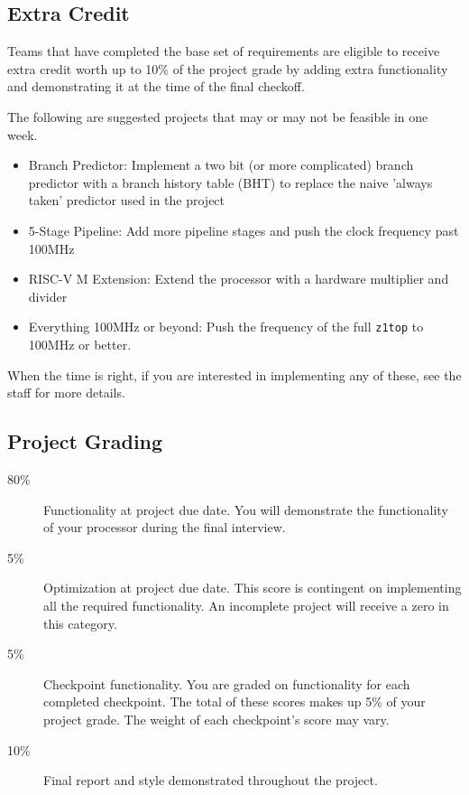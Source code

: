\documentclass[11pt]{article}
\begin{document}
\subsection{Extra Credit}
\label{extra_credit}
Teams that have completed the base set of requirements are eligible to receive extra credit worth up to 10\% of the project grade by adding extra functionality and demonstrating it at the time of the final checkoff.

The following are suggested projects that may or may not be feasible in one week.
\begin{itemize}
  \item Branch Predictor: Implement a two bit (or more complicated) branch predictor with a branch history table (BHT) to replace the naive 'always taken' predictor used in the project
  \item 5-Stage Pipeline: Add more pipeline stages and push the clock frequency past 100MHz
  \item RISC-V M Extension: Extend the processor with a hardware multiplier and divider
  \item Everything 100MHz or beyond: Push the frequency of the full \verb|z1top| to 100MHz or better.
\end{itemize}

When the time is right, if you are interested in implementing any of these, see the staff for more details.

\subsection{Project Grading}
\label{deadlinegrading}

\begin{description}
  \item[80\%] {Functionality} at project due date. You will demonstrate the functionality of your processor during the final interview.
  \item[5\%] {Optimization} at project due date. This score is contingent on implementing all the required functionality. An incomplete project will receive a zero in this category.
  \item[5\%] {Checkpoint} functionality. You are graded on functionality for each completed checkpoint. The total of these scores makes up 5\% of your project grade. The weight of each checkpoint's score may vary.
  \item[10\%] {Final report} and {style} demonstrated throughout the project.
\end{description}
\end{document}
